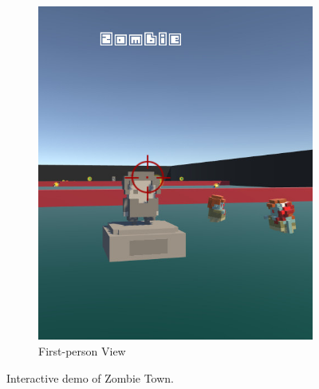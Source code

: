 \documentclass[review]{vgtc}                 %
\begin{document}
\begin{figure}[h]
	~
	\begin{subfigure}{0.47\linewidth}
		\centering	
		\includegraphics[width=\linewidth]{./figs/zombie_virtual.jpg}
		\caption[]{\label{fig:zombie_virtual} First-person View
		}
	\end{subfigure}		
	\caption[]{\label{fig:zombie}
		Interactive demo of Zombie Town.
	}
\end{figure}



\end{document}
